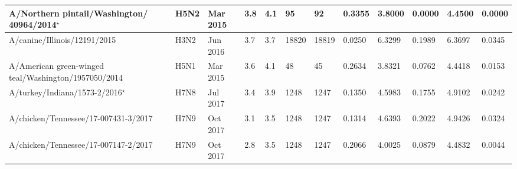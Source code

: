 \begin{tabular}{L{1.35in}|L{.35in}|L{.3in}|L{.3in}|L{.3in}|L{.35in}|L{.35in}|L{.35in}|L{.3in}|L{.3in}|L{.3in}|L{.3in}}
 A/Northern  pintail/Washington/ 40964/2014$^{\star}$ &H5N2& Mar  2015 &3.8&4.1&95&92&0.3355&3.8000&0.0000&4.4500&0.0000\\\hline
 A/canine/Illinois/12191/2015 &H3N2& Jun  2016 &3.7&3.7&18820&18819&0.0250&6.3299&0.1989&6.3697&0.0345\\\hline
 A/American  green-winged  teal/Washington/1957050/2014 &H5N1& Mar  2015 &3.6&4.1&48&45&0.2634&3.8321&0.0762&4.4418&0.0153\\\hline
 A/turkey/Indiana/1573-2/2016$^{\star}$ &H7N8& Jul  2017 &3.4&3.9&1248&1247&0.1350&4.5983&0.1755&4.9102&0.0242\\\hline
 A/chicken/Tennessee/17-007431-3/2017 &H7N9& Oct  2017 &3.1&3.5&1248&1247&0.1314&4.6393&0.2022&4.9426&0.0324\\\hline
 A/chicken/Tennessee/17-007147-2/2017 &H7N9& Oct  2017 &2.8&3.5&1248&1247&0.2066&4.0025&0.0879&4.4832&0.0044\\\hline
\end{tabular}
